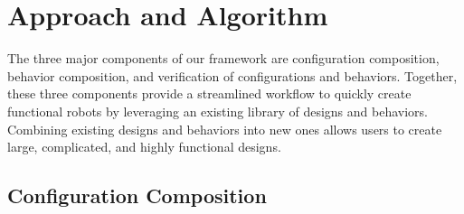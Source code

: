 \documentclass[graybox]{svmult}
\begin{document}
% 

\section{Approach and Algorithm} \label{sec:approach} The three major
components of our framework are configuration composition, behavior
composition, and verification of configurations and behaviors.  Together,
these three components provide a streamlined workflow to quickly create
functional robots by leveraging an existing library of designs and behaviors.
Combining existing designs and behaviors into new ones allows users to create
large, complicated, and highly functional designs.

\subsection{Configuration Composition} \label{sec:conf_composition}
\end{document}
